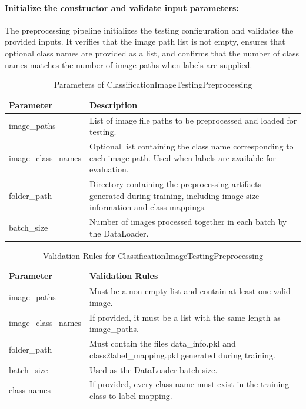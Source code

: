 \paragraph{Initialize the constructor and validate input parameters:}\par
The preprocessing pipeline initializes the testing configuration and validates the provided inputs. It verifies that the image path list is not empty, ensures that optional class names are provided as a list, and confirms that the number of class names matches the number of image paths when labels are supplied.
\begin{table}[H]
\centering
\small
\renewcommand{\arraystretch}{1.15}
\setlength{\tabcolsep}{4pt}
\begin{tabular}{lp{9cm}}
\toprule
\textbf{Parameter} & \textbf{Description} \\
\midrule
image\_paths & List of image file paths to be preprocessed and loaded for testing. \\
\midrule
image\_class\_names & Optional list containing the class name corresponding to each image path. Used when labels are available for evaluation. \\
\midrule
folder\_path & Directory containing the preprocessing artifacts generated during training, including image size information and class mappings. \\
\midrule
batch\_size & Number of images processed together in each batch by the DataLoader. \\
\bottomrule
\end{tabular}
\caption{Parameters of ClassificationImageTestingPreprocessing}
\label{tab:image_testing_parameters}
\end{table}
\begin{table}[H]
\centering
\small
\renewcommand{\arraystretch}{1.15}
\setlength{\tabcolsep}{4pt}
\begin{tabular}{lp{9cm}}
\toprule
\textbf{Parameter} & \textbf{Validation Rules} \\
\midrule
image\_paths & Must be a non-empty list and contain at least one valid image. \\
\midrule
image\_class\_names & If provided, it must be a list with the same length as image\_paths. \\
\midrule
folder\_path & Must contain the files data\_info.pkl and class2label\_mapping.pkl generated during training. \\
\midrule
batch\_size & Used as the DataLoader batch size. \\
\midrule
class names & If provided, every class name must exist in the training class-to-label mapping. \\
\bottomrule
\end{tabular}
\caption{Validation Rules for ClassificationImageTestingPreprocessing}
\label{tab:image_testing_validation}
\end{table}
\vspace{1cm}

